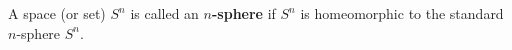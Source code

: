 A space (or set) $S^n$ is called an \textbf{$n$-sphere} if $S^n$ is homeomorphic to the standard $n$-sphere $S^n$.
